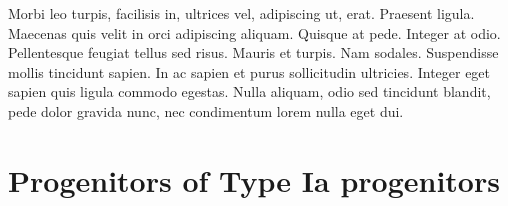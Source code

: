 Morbi leo turpis, facilisis in, ultrices vel, adipiscing ut,
erat. Praesent ligula. Maecenas quis velit in orci adipiscing
aliquam. Quisque at pede. Integer at odio. Pellentesque feugiat tellus
sed risus. Mauris et turpis. Nam sodales. Suspendisse mollis tincidunt
sapien. In ac sapien et purus sollicitudin ultricies. Integer eget
sapien quis ligula commodo egestas. Nulla aliquam, odio sed tincidunt
blandit, pede dolor gravida nunc, nec condimentum lorem nulla eget
dui.  
\section{Progenitors of Type Ia progenitors}
\label{sec:snia_progenitor}


